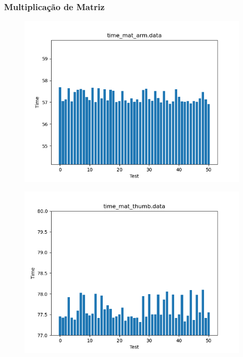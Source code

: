 \documentclass[a4paper,10pt]{article}
\begin{document}
\subsubsection*{Multiplicação de Matriz}
\begin{figure}[H]
 \includegraphics[width=\linewidth]{data/time_mat_arm.png}
\end{figure}

\begin{figure}[H]
 \includegraphics[width=\linewidth]{data/time_mat_thumb.png}
\end{figure}
\end{document}
